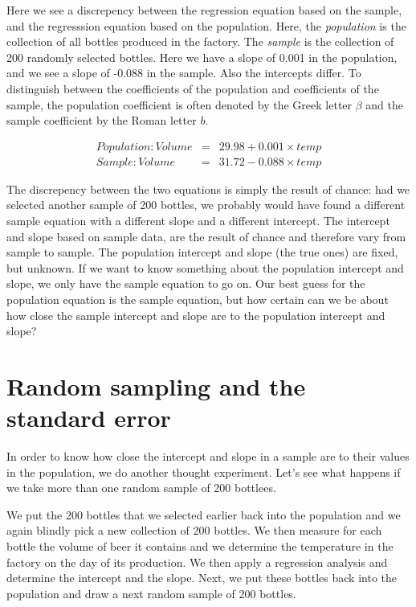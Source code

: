 \documentclass[]{book}\usepackage[]{graphicx}\usepackage[]{color}
\begin{document}
Here we see a discrepency between the regression equation based on the sample, and the regresssion equation based on the population. Here, the \textit{population} is the collection of all bottles produced in the factory. The \textit{sample} is the collection of 200 randomly selected bottles. Here we have a slope of 0.001 in the population, and we see a slope of -0.088 in the sample. Also the intercepts differ. To distinguish between the coefficients of the population and coefficients of the sample, the population coefficient is often denoted by the Greek letter $\beta$ and the sample coefficient by the Roman letter $b$.



\begin{eqnarray}
Population: Volume &=& 29.98 + 0.001 \times temp  \nonumber\\
Sample: Volume &=&  31.72  -0.088 \times temp \nonumber
\end{eqnarray}

The discrepency between the two equations is simply the result of chance: had we selected another sample of 200 bottles, we probably would have found a different sample equation with a different slope and a different intercept. The intercept and slope based on sample data, are the result of chance and therefore vary from sample to sample. The population intercept and slope (the true ones) are fixed, but unknown. If we want to know something about the population intercept and slope, we only have the sample equation to go on. Our best guess for the population equation is the sample equation, but how certain can we be about how close the sample intercept and slope are to the population intercept and slope?


\section{Random sampling and the standard error}


In order to know how close the intercept and slope in a sample are to their values in the population, we do another thought experiment. Let's see what happens if we take more than one random sample of 200 bottlees. 

We put the 200 bottles that we selected earlier back into the population and we again blindly pick a new collection of 200 bottles. We then measure for each bottle the volume of beer it contains and we determine the temperature in the factory on the day of its production. We then apply a regression analysis and determine the intercept and the slope. Next, we put these bottles back into the population and draw a next random sample of 200 bottles.
\end{document}
